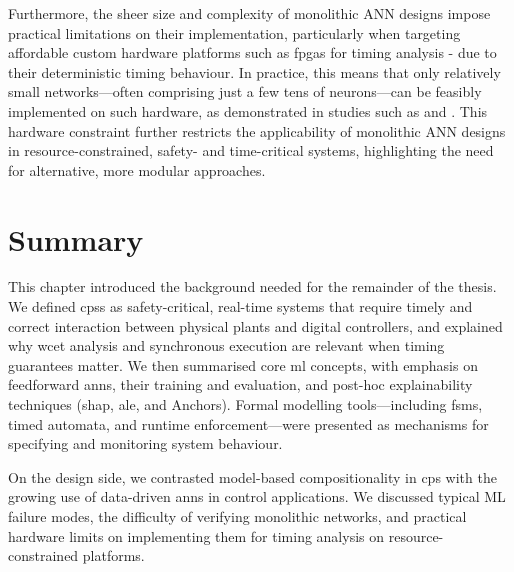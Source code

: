 Furthermore, the sheer size and complexity of monolithic ANN designs impose practical limitations on their implementation, particularly when targeting affordable custom hardware platforms such as \glspl{fpga} for timing analysis - due to their deterministic timing behaviour. In practice, this means that only relatively small networks—often comprising just a few tens of neurons—can be feasibly implemented on such hardware, as demonstrated in studies such as \cite{saric_fpga-based_2020} and \cite{nguyen_efficient_2018}. This hardware constraint further restricts the applicability of monolithic ANN designs in resource-constrained, safety- and time-critical systems, highlighting the need for alternative, more modular approaches.


\section{Summary}

This chapter introduced the background needed for the remainder of the thesis. We defined \glspl{cps} as safety-critical, real-time systems that require timely and correct interaction between physical plants and digital controllers, and explained why \gls{wcet} analysis and synchronous execution are relevant when timing guarantees matter. We then summarised core \gls{ml} concepts, with emphasis on feedforward \glspl{ann}, their training and evaluation, and post-hoc explainability techniques (\gls{shap}, \gls{ale}, and Anchors). Formal modelling tools---including \glspl{fsm}, timed automata, and runtime enforcement---were presented as mechanisms for specifying and monitoring system behaviour.

On the design side, we contrasted model-based compositionality in \gls{cps} with the growing use of data-driven \glspl{ann} in control applications. We discussed typical ML failure modes, the difficulty of verifying monolithic networks, and practical hardware limits on implementing them for timing analysis on resource-constrained platforms.
